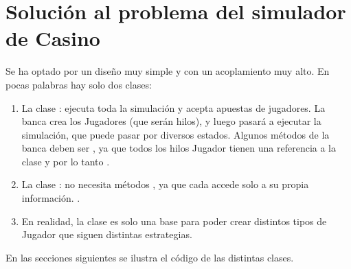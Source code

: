 \documentclass[letterpaper,10pt,spanish]{sphinxmanual}
\begin{document}
\section{Solución al problema del simulador de Casino}
\label{\detokenize{textos/anexos:solucion-al-problema-del-simulador-de-casino}}
Se ha optado por un diseño muy simple y con un acoplamiento muy alto. En pocas palabras hay solo dos clases:
\begin{enumerate}
%
\item {} 
La clase : ejecuta toda la simulación y acepta apuestas de jugadores. La banca crea los Jugadores (que serán hilos), y luego pasará a ejecutar la simulación, que puede pasar por diversos estados. Algunos métodos de la banca deben ser , ya que todos los hilos Jugador tienen una referencia a la clase  y por lo tanto .

\item {} 
La clase : no necesita métodos , ya que cada  accede solo a su propia información. .

\item {} 
En realidad, la clase  es solo una base para poder crear distintos tipos de Jugador que siguen distintas estrategias.

\end{enumerate}

En las secciones siguientes se ilustra el código de las distintas clases.
\end{document}
